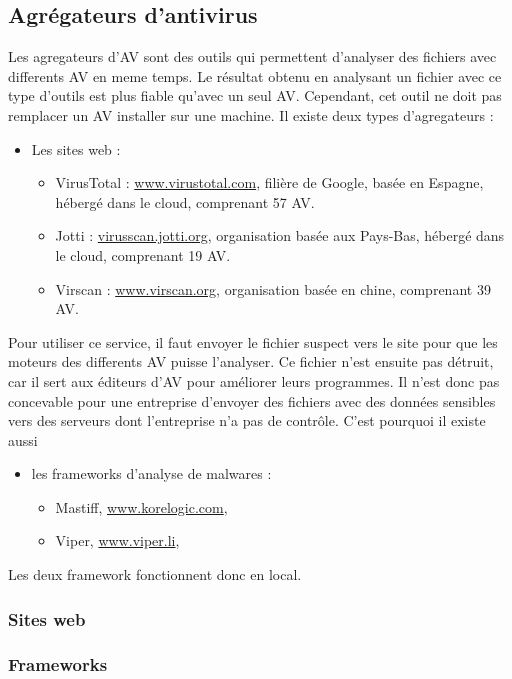 \documentclass[smallextended]{svjour3}       %
\begin{document}
\subsection{Agrégateurs d'antivirus}
\label{2.2agrégateurs}
Les agregateurs d'AV sont des outils qui permettent d'analyser des fichiers avec differents AV en meme temps. Le résultat obtenu en analysant un fichier avec ce type d'outils est plus fiable qu'avec un seul AV. Cependant, cet outil ne doit pas remplacer un AV installer sur une machine. Il existe deux types d'agregateurs : 
\begin{itemize}
\item Les sites web : 
	\begin{itemize}
	\item VirusTotal : \url{www.virustotal.com}, filière de Google, basée en Espagne, hébergé dans le cloud, comprenant 57 AV.
	\item Jotti : \url{virusscan.jotti.org}, organisation basée aux Pays-Bas, hébergé dans le cloud, comprenant 19 AV.
	\item Virscan : \url{www.virscan.org}, organisation basée en chine, comprenant 39 AV.
	\end{itemize}
\end{itemize}
Pour utiliser ce service, il faut envoyer le fichier suspect vers le site pour que les moteurs des differents AV puisse l'analyser. Ce fichier n'est ensuite pas détruit, car il sert aux éditeurs d'AV pour améliorer leurs programmes. Il n'est donc pas concevable pour une entreprise d'envoyer des fichiers avec des données sensibles vers des serveurs dont l'entreprise n'a pas de contrôle. C'est pourquoi il existe aussi
\begin{itemize}
\item les frameworks d'analyse de malwares : 
	\begin{itemize}
	\item Mastiff, \url{www.korelogic.com}, 
	\item Viper, \url{www.viper.li},
	\end{itemize}
\end{itemize}
Les deux framework fonctionnent donc en local.

\subsubsection{Sites web}
\label{2.2.1sites}

\subsubsection{Frameworks}
\label{2.2.2frameworks}
\end{document}
